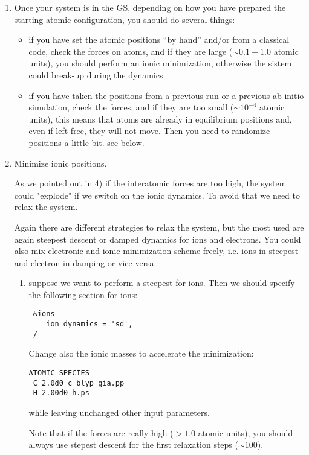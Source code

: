 \documentclass[12pt,a4paper]{article}
\begin{document}
\begin{enumerate}
  \item
    Once your system is in the GS, depending on how you have prepared
    the starting atomic configuration, you should do several things:
    \begin{itemize}
      \item
        if you have set the atomic positions ``by hand'' and/or from a
        classical code, check the forces on atoms, and if they are
        large ($\sim 0.1 - 1.0$ atomic units), you should perform an
        ionic minimization, otherwise the sistem could break-up during
        the dynamics.
      \item
        if you have taken the positions from a previous run or a
        previous ab-initio simulation, check the forces, and if they
        are too small ($\sim 10^{-4}$ atomic units), this means that
        atoms are already in equilibrium positions and, even if left
        free, they will not move.
        Then you need to randomize positions a little bit. see below.
    \end{itemize}

  \item
    Minimize ionic positions.

    As we pointed out in 4) if the interatomic forces are too high,
    the system could "explode" if we switch on the ionic dynamics.
    To avoid that we need to relax the system. 

    Again there are different strategies to relax the system, but the
    most used are again steepest descent or damped dynamics for ions
    and electrons.
    You could also mix electronic and ionic minimization scheme
    freely, i.e. ions in steepest and electron in damping or vice
    versa.
   
    \begin{enumerate}
      \item
        suppose we want to perform a steepest for ions.
        Then we should specify the following section for ions:
\begin{verbatim}
 &ions
    ion_dynamics = 'sd',
 /
\end{verbatim}
        Change also the ionic masses to accelerate the minimization:
\begin{verbatim}
ATOMIC_SPECIES
 C 2.0d0 c_blyp_gia.pp
 H 2.00d0 h.ps
\end{verbatim}
        while leaving unchanged other input parameters.   

        Note that if the forces are really high ($> 1.0$ atomic
        units), you should always use stepest descent for the first
        relaxation steps ($\sim 100$).
   

\end{enumerate}
\end{enumerate}
\end{document}
